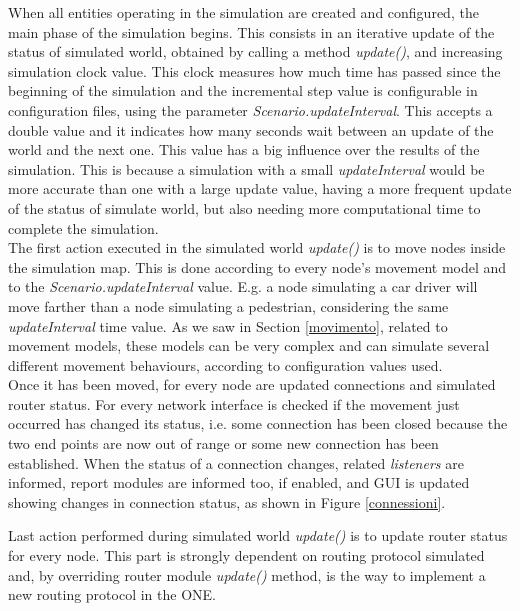 When all entities operating in the simulation are created and configured, the main phase of the simulation begins. This consists in an iterative update of the status of simulated world, obtained by calling a method \textit{update()}, and increasing simulation clock value. This clock measures how much time has passed since the beginning of the simulation and the incremental step value is configurable in configuration files, using the parameter \textit{Scenario.updateInterval}. This accepts a double value and it indicates how many seconds wait between an update of the world and the next one. This value has a big influence over the results of the simulation. This is because a simulation with a small \textit{updateInterval} would be more accurate than one with a large update value, having a more frequent update of the status of simulate world, but also needing more computational time to complete the simulation.
\\

The first action executed in the simulated world \textit{update()} is to move nodes inside the simulation map. This is done according to every node's movement model and to the \textit{Scenario.updateInterval} value. E.g. a node simulating a car driver will move farther than a node simulating a pedestrian, considering the same \textit{updateInterval} time value. As we saw in Section \ref{movimento}, related to movement models, these models can be very complex and can simulate several different movement behaviours, according to configuration values used.
\\

Once it has been moved, for every node are updated connections and simulated router status. For every network interface is checked if the movement just occurred has changed its status, i.e. some connection has been closed because the two end points are now out of range or some new connection has been established. When the status of a connection changes, related \textit{listeners} are informed, report modules are informed too, if enabled, and GUI is updated showing changes in connection status, as shown in Figure \ref{connessioni}.
\\

Last action performed during simulated world \textit{update()} is to update router status for every node. This part is strongly dependent on routing protocol simulated and, by overriding router module \textit{update()} method, is the way to implement a new routing protocol in the ONE.

